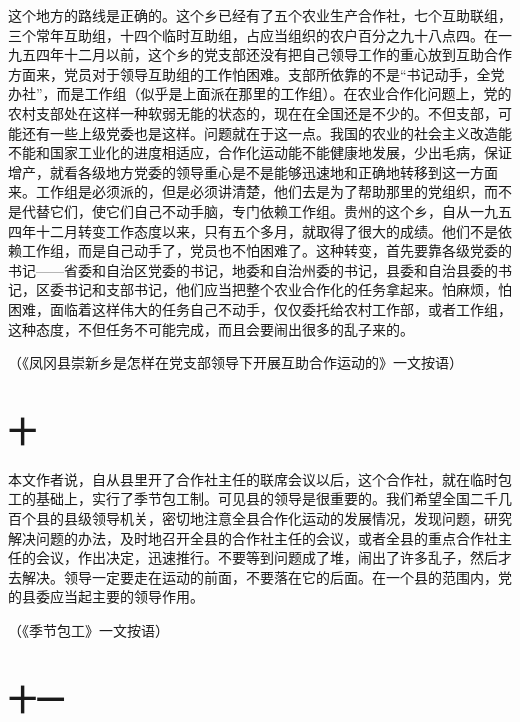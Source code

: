 这个地方的路线是正确的。这个乡已经有了五个农业生产合作社，七个互助联组，三个常年互助组，十四个临时互助组，占应当组织的农户百分之九十八点四。在一九五四年十二月以前，这个乡的党支部还没有把自己领导工作的重心放到互助合作方面来，党员对于领导互助组的工作怕困难。支部所依靠的不是“书记动手，全党办社”，而是工作组（似乎是上面派在那里的工作组）。在农业合作化问题上，党的农村支部处在这样一种软弱无能的状态的，现在在全国还是不少的。不但支部，可能还有一些上级党委也是这样。问题就在于这一点。我国的农业的社会主义改造能不能和国家工业化的进度相适应，合作化运动能不能健康地发展，少出毛病，保证增产，就看各级地方党委的领导重心是不是能够迅速地和正确地转移到这一方面来。工作组是必须派的，但是必须讲清楚，他们去是为了帮助那里的党组织，而不是代替它们，使它们自己不动手脑，专门依赖工作组。贵州的这个乡，自从一九五四年十二月转变工作态度以来，只有五个多月，就取得了很大的成绩。他们不是依赖工作组，而是自己动手了，党员也不怕困难了。这种转变，首先要靠各级党委的书记——省委和自治区党委的书记，地委和自治州委的书记，县委和自治县委的书记，区委书记和支部书记，他们应当把整个农业合作化的任务拿起来。怕麻烦，怕困难，面临着这样伟大的任务自己不动手，仅仅委托给农村工作部，或者工作组，这种态度，不但任务不可能完成，而且会要闹出很多的乱子来的。


（《凤冈县崇新乡是怎样在党支部领导下开展互助合作运动的》一文按语）

\section*{十}

本文作者说，自从县里开了合作社主任的联席会议以后，这个合作社，就在临时包工的基础上，实行了季节包工制。可见县的领导是很重要的。我们希望全国二千几百个县的县级领导机关，密切地注意全县合作化运动的发展情况，发现问题，研究解决问题的办法，及时地召开全县的合作社主任的会议，或者全县的重点合作社主任的会议，作出决定，迅速推行。不要等到问题成了堆，闹出了许多乱子，然后才去解决。领导一定要走在运动的前面，不要落在它的后面。在一个县的范围内，党的县委应当起主要的领导作用。


（《季节包工》一文按语）

\section*{十一}

